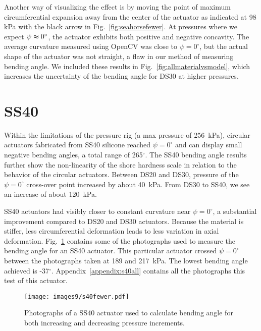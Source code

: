 Another way of visualizing the effect is by moving the point of maximum circumferential expansion away from the center of the actuator as indicated at 98 kPa with the black arrow in Fig.~\ref{fig:seahorsefewer}. At pressures where we expect $\psi\thickapprox0^\circ$, the actuator exhibits both positive and negative concavity. The average curvature measured using OpenCV was close to $\psi=0^\circ$, but the actual shape of the actuator was not straight, a flaw in our method of measuring bending angle. We included these results in Fig.~\ref{fig:allmaterialvsmodel}, which increases the uncertainty of the bending angle for DS30 at higher pressures. 

\clearpage
\section{SS40}

Within the limitations of the pressure rig (a max pressure of 256~kPa), circular actuators fabricated from SS40 silicone reached $\psi=0^\circ$ and can display small negative bending angles, a total range of 265$^\circ$. 
The SS40 bending angle results further show the non-linearity of the shore hardness scale in relation to the behavior of the circular actuators. Between DS20 and DS30, pressure of the $\psi=0^\circ$ cross-over point increased by about 40~kPa. From DS30 to SS40, we see an increase of about 120~kPa. 

SS40 actuators had visibly closer to constant curvature near $\psi=0^\circ$, a substantial improvement compared to DS20 and DS30 actuators. Because the material is stiffer, less circumferential deformation leads to less variation in axial deformation. Fig.~\ref{fig:ss40fewer} contains some of the photographs used to measure the bending angle for an SS40 actuator. This particular actuator crossed $\psi=0^\circ$ between the photographs taken at 189 and 217~kPa. The lowest bending angle achieved is -37$^\circ$. Appendix~\ref{appendix:s40all} contains all the photographs this test of this actuator. \\

\begin{figure}[!ht]
    \centering
     \texttt{[image: images9/s40fewer.pdf]}
    \caption{Photographs of a SS40 actuator used to calculate bending angle for both increasing and decreasing pressure increments.}
    \label{fig:ss40fewer}
\end{figure}


